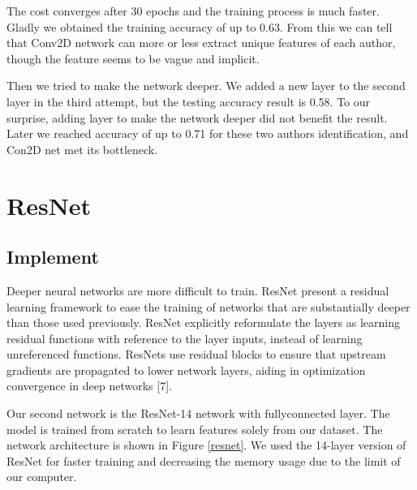 \documentclass{article}
\begin{document}

The cost converges after 30 epochs and the training process is much faster. Gladly we obtained the training accuracy of up to 0.63. From this we can tell that Conv2D network can more or less  extract unique features of each author, though the feature seems to be vague and implicit.

Then we tried to make the network deeper. We added a new layer to the second layer in the third attempt, but the testing accuracy result is 0.58. To our surprise, adding layer to make the network deeper did not benefit the result. Later we reached accuracy of up to 0.71 for these two authors identification, and Con2D net met its bottleneck.



\section{ResNet}
\subsection{Implement}

Deeper neural networks are more difficult to train. ResNet present a residual learning framework to ease the training of networks that are substantially deeper than those used previously. ResNet explicitly reformulate the layers as learning residual functions with reference to the layer inputs, instead of learning unreferenced functions. ResNets use residual blocks to ensure that upstream gradients are propagated to lower network layers, aiding in optimization convergence in deep networks [7].


Our second network is the ResNet-14 network with fullyconnected layer. The model is trained from scratch to learn features solely from our dataset. 	The network architecture is shown in Figure \ref{resnet}. We used the 14-layer version of ResNet for faster training and decreasing the memory usage due to the limit of our computer.
\end{document}
